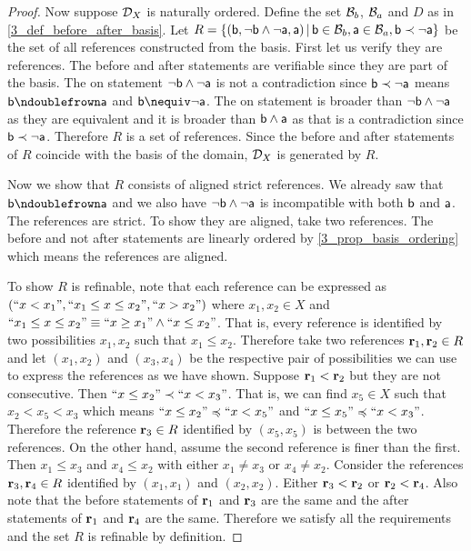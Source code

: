 \documentclass[11pt,letterpaper,fleqn]{memoir} %
\begin{document}
\begin{mathSection}
\begin{proof}
	Now suppose $\edomain_X$ is naturally ordered. Define the set $\basis_b$, $\basis_a$ and $D$ as in \ref{3_def_before_after_basis}. Let $R = \{ (\stmt[b], \NOT \stmt[b] \AND \NOT \stmt[a], \stmt[a]) \, | \, \stmt[b] \in \basis_b, \stmt[a] \in \basis_a, \stmt[b] \snarrower \NOT \stmt[a] \}$ be the set of all references constructed from the basis. First let us verify they are references. The before and after statements are verifiable since they are part of the basis. The on statement $\NOT \stmt[b] \AND \NOT \stmt[a]$ is not a contradiction since $\stmt[b] \snarrower \NOT \stmt[a]$ means $\stmt[b] \ncomp \stmt[a]$ and $\stmt[b] \nequiv \NOT \stmt[a]$. The on statement is broader than $\NOT \stmt[b] \AND \NOT \stmt[a]$ as they are equivalent and it is broader than $\stmt[b] \AND \stmt[a]$ as that is a contradiction since $\stmt[b] \snarrower \NOT \stmt[a]$. Therefore $R$ is a set of references. Since the before and after statements of $R$ coincide with the basis of the domain, $\edomain_X$ is generated by $R$.
	
	Now we show that $R$ consists of aligned strict references. We already saw that $\stmt[b] \ncomp \stmt[a]$ and we also have $\NOT \stmt[b] \AND \NOT \stmt[a]$ is incompatible with both $\stmt[b]$ and $\stmt[a]$. The references are strict. To show they are aligned, take two references. The before and not after statements are linearly ordered by \ref{3_prop_basis_ordering} which means the references are aligned.
	
	To show $R$ is refinable, note that each reference can be expressed as $(``x < x_1", ``x_1 \leq x \leq x_2", ``x > x_2")$ where $x_1, x_2 \in X$ and $``x_1 \leq x \leq x_2" \equiv ``x \geq x_1" \AND ``x \leq x_2"$. That is, every reference is identified by two possibilities $x_1, x_2$ such that $x_1 \leq x_2$. Therefore take two references $\refStmt_1, \refStmt_2 \in R$ and let $(x_1, x_2)$ and $(x_3, x_4)$ be the respective pair of possibilities we can use to express the references as we have shown. Suppose $\refStmt_1 < \refStmt_2$ but they are not consecutive. Then $``x \leq x_2" \snarrower ``x < x_3"$. That is, we can find $x_5 \in X$ such that  $x_2 < x_5 < x_3$ which means $``x \leq x_2" \narrower ``x < x_5"$ and $``x \leq x_5" \narrower ``x < x_3"$. Therefore the reference $\refStmt_3 \in R$ identified by $(x_5, x_5)$ is between the two references. On the other hand, assume the second reference is finer than the first. Then $x_1 \leq x_3$ and $x_4 \leq x_2$ with either $x_1 \neq x_3$ or $x_4 \neq x_2$. Consider the references $\refStmt_3, \refStmt_4 \in R$ identified by $(x_1, x_1)$ and $(x_2, x_2)$. Either $\refStmt_3 < \refStmt_2$ or $\refStmt_2 < \refStmt_4$. Also note that the before statements of $\refStmt_1$ and $\refStmt_3$ are the same and the after statements of $\refStmt_1$ and $\refStmt_4$ are the same. Therefore we satisfy all the requirements and the set $R$ is refinable by definition.
\end{proof}
\end{mathSection}
\end{document}
